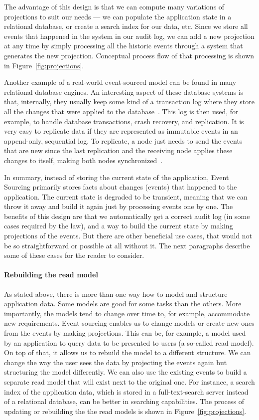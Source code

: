 \documentclass{book}
\begin{document}
The advantage of this design is that we can compute many variations of
projections to suit our needs --- we can populate the application state
in a relational database, or create a search index for our data, etc.
Since we store all events that happened in the system in our audit log,
we can add a new projection at any time by simply processing all the
historic events through a system that generates the new projection.
Conceptual process flow of that processing is shown in Figure~\ref{fig:projections}.

Another example of a real-world event-sourced model can be found in many
relational database engines. An interesting aspect of these database
systems is that, internally, they usually keep some kind of a
transaction log where they store all the changes that were applied to
the database~\cite{cqrsnu-eventsourcing}. This log is then used, for
example, to handle database transactions, crash recovery, and
replication. It is very easy to replicate data if they are represented
as immutable events in an append-only, sequential log. To replicate, a
node just needs to send the events that are new since the last
replication and the receiving node applies these changes to itself,
making both nodes synchronized~\cite{replica}.

In summary, instead of storing the current state of the application,
Event Sourcing primarily stores facts about changes (events) that
happened to the application. The current state is degraded to be
transient, meaning that we can throw it away and build it again just by
processing events one by one. The benefits of this design are that we
automatically get a correct audit log (in some cases required by the
law), and a way to build the current state by making projections of the
events. But there are other beneficial use cases, that would not be so
straightforward or possible at all without it. The next paragraphs
describe some of these cases for the reader to consider.


\paragraph{Rebuilding the read model}\label{rebuilding-the-read-model}

As stated above, there is more than one way how to model and structure
application data. Some models are good for some tasks than the others.
More importantly, the models tend to change over time to, for example,
accommodate new requirements. Event sourcing enables us to change models
or create new ones from the events by making projections. This can be,
for example, a model used by an application to query data to be
presented to users (a so-called read model). On top of that, it allows
us to rebuild the model to a different structure. We can change the way
the user sees the data by projecting the events again but structuring
the model differently. We can also use the existing events to build a
separate read model that will exist next to the original one. For
instance, a search index of the application data, which is stored in a
full-text-search server instead of a relational database, can be better
in searching capabilities. The process of updating or rebuilding the the
read models is shown in Figure~\ref{fig:projections}.
\end{document}
